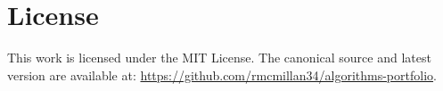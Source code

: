 \section*{License}

This work is licensed under the MIT License.
The canonical source and latest version are available at:
\href{https://github.com/rmcmillan34/algorithms-portfolio}{https://github.com/rmcmillan34/algorithms-portfolio}.

